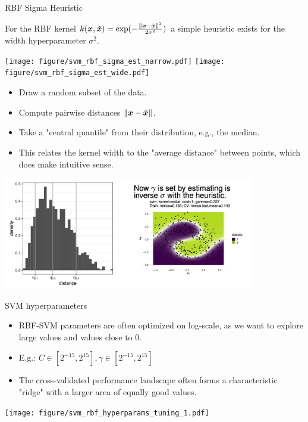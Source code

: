 \begin{vbframe}{RBF Sigma Heuristic}

For the RBF kernel $k(\bm{x}, \tilde {\bm{x}}) = \exp(-\frac{\|\bm{x} - \tilde {\bm{x}} \|^2}{2\sigma^2})$ a simple heuristic exists for the width hyperparameter $\sigma^2$. 

\lz


\begin{center}
  \texttt{[image: figure/svm\_rbf\_sigma\_est\_narrow.pdf]}
  \texttt{[image: figure/svm\_rbf\_sigma\_est\_wide.pdf]}
\end{center}  
\begin{footnotesize} 

\end{footnotesize}


\framebreak


\begin{itemize}
  \item Draw a random subset of the data.
  \item Compute pairwise distances $\|\bm{x} - \tilde {\bm{x}} \|$.
  \item Take a "central quantile" from their distribution, e.g., the median.
  \item This relates the kernel width to the "average distance" between points,
    which does make intuitive sense.
\end{itemize}

\begin{center}
\includegraphics[width = 11cm ]{figure_man/rbf_sigma.png}
\end{center}


\framebreak

\end{vbframe}

\begin{vbframe}{SVM hyperparameters}
\begin{itemize}
\item RBF-SVM parameters are often optimized on log-scale, as we want to explore
  large values and values close to 0.
\item E.g.: $C \in [2^{-15}, 2^{15}], \gamma \in [2^{-15}, 2^{15}]$
\item The cross-validated performance landscape often forms
  a characteristic "ridge" with a larger area of equally good values.
\end{itemize}

\begin{center}
  \texttt{[image: figure/svm\_rbf\_hyperparams\_tuning\_1.pdf]}
\end{center}

\end{vbframe}

\endlecture

